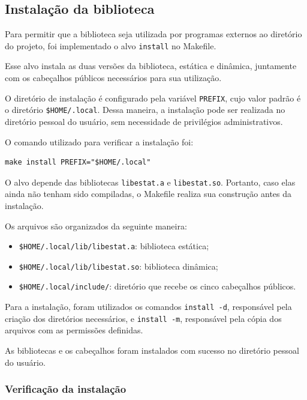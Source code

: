 \documentclass[12pt,a4paper]{article}
\newcommand{\cod}[1]{\texttt{#1}}
\begin{document}
\subsection{Instalação da biblioteca}

Para permitir que a biblioteca seja utilizada por programas
externos ao diretório do projeto, foi implementado o alvo
\cod{install} no Makefile.

Esse alvo instala as duas versões da biblioteca,
estática e dinâmica, juntamente com os cabeçalhos
públicos necessários para sua utilização.

O diretório de instalação é configurado pela variável
\cod{PREFIX}, cujo valor padrão é o diretório
\cod{\$HOME/.local}. Dessa maneira, a instalação
pode ser realizada no diretório pessoal do usuário,
sem necessidade de privilégios administrativos.

O comando utilizado para verificar a instalação foi:

\begin{lstlisting}[style=shell]
make install PREFIX="$HOME/.local"
\end{lstlisting}

O alvo depende das bibliotecas
\cod{libestat.a} e \cod{libestat.so}.
Portanto, caso elas ainda não tenham sido compiladas,
o Makefile realiza sua construção antes da instalação.

Os arquivos são organizados da seguinte maneira:

\begin{itemize}
    \item \cod{\$HOME/.local/lib/libestat.a}:
    biblioteca estática;

    \item \cod{\$HOME/.local/lib/libestat.so}:
    biblioteca dinâmica;

    \item \cod{\$HOME/.local/include/}:
    diretório que recebe os cinco cabeçalhos públicos.
\end{itemize}

Para a instalação, foram utilizados os comandos
\cod{install -d}, responsável pela criação dos
diretórios necessários, e \cod{install -m},
responsável pela cópia dos arquivos com as permissões
definidas.

As bibliotecas e os cabeçalhos foram instalados
com sucesso no diretório pessoal do usuário.

\subsubsection{Verificação da instalação}
\end{document}
